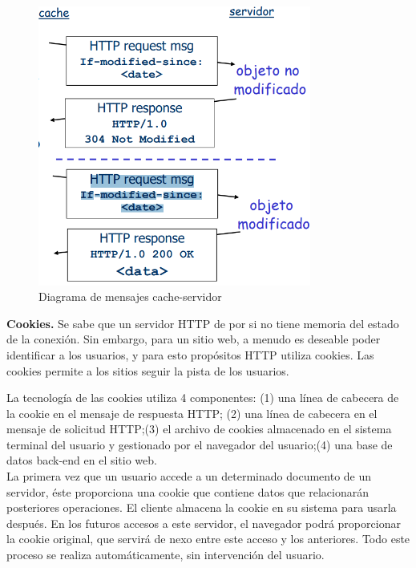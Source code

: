 \documentclass[a4paper,11pt]{article}
\begin{document}
\begin{figure}[h]
\centering
\caption{Diagrama de mensajes cache-servidor}
\includegraphics[scale=1,width=0.8\textwidth]{ejemplo_mensajes_web_cache.png}
\end{figure}

\textbf{Cookies.} Se sabe que un servidor HTTP de por si no tiene memoria del estado de la conexión. Sin embargo, para un sitio web, a menudo es deseable poder identificar a los usuarios, y para esto propósitos HTTP utiliza cookies. Las cookies permite a los sitios seguir la pista de los usuarios.  

La tecnología de las cookies utiliza 4 componentes: (1) una línea de cabecera de la cookie en el mensaje de respuesta HTTP; (2) una línea de cabecera en el mensaje de solicitud HTTP;(3) el archivo de cookies almacenado en el sistema terminal del usuario y gestionado por el navegador del usuario;(4) una base de datos back-end en el sitio web. \\

La primera vez que un usuario accede a un determinado documento de un servidor, éste proporciona una cookie que contiene datos que relacionarán posteriores operaciones. El cliente almacena la cookie en su sistema para usarla después. En los futuros accesos a este servidor, el navegador podrá proporcionar la cookie original, que servirá de nexo entre este acceso y los anteriores. Todo este proceso se realiza automáticamente, sin intervención del usuario. \\
\end{document}
